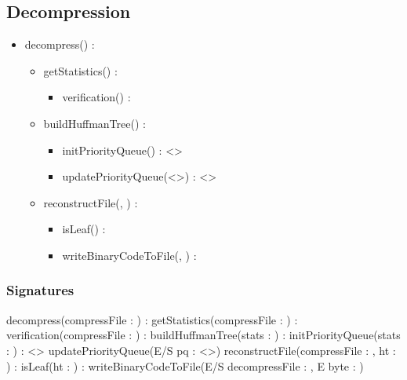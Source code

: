\subsection{Decompression}


\begin{itemize}
    \item decompress(\binaryFile) : \binaryFile
    \begin{itemize}
        \item getStatistics(\binaryFile) : \statistics
        \begin{itemize}
            \item verification(\binaryFile) : \booleen
        \end{itemize}
        \item buildHuffmanTree(\statistics) : \huffmanTree
        \begin{itemize}
            \item initPriorityQueue(\statistics) : \priorityQueue<\huffmanTree>
            \item updatePriorityQueue(\priorityQueue<\huffmanTree>) : \priorityQueue<\huffmanTree>
        \end{itemize}
        \item reconstructFile(\binaryFile, \huffmanTree) : \binaryFile
        \begin{itemize}
            \item isLeaf(\huffmanTree) : \booleen
            \item writeBinaryCodeToFile(\binaryFile, \byte) : \binaryFile
        \end{itemize}
    \end{itemize}
\end{itemize}

\subsubsection{Signatures}

\function decompress(compressFile : \binaryFile) : \binaryFile
\function getStatistics(compressFile : \binaryFile) : \statistics
\function verification(compressFile : \binaryFile) : \booleen
\function buildHuffmanTree(stats : \statistics) : \huffmanTree
\function initPriorityQueue(stats : \statistics) : \priorityQueue<\huffmanTree>
\procedure updatePriorityQueue(E/S pq : \priorityQueue<\huffmanTree>)
\function reconstructFile(compressFile : \binaryFile, ht : \huffmanTree) : \binaryFile
\function isLeaf(ht : \huffmanTree) : \booleen
\procedure writeBinaryCodeToFile(E/S decompressFile : \binaryFile, E byte : \byte) 